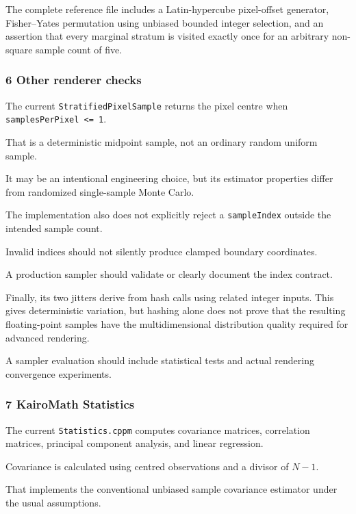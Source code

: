 The complete reference file includes a Latin-hypercube pixel-offset generator, Fisher--Yates permutation using unbiased bounded integer selection, and an assertion that every marginal stratum is visited exactly once for an arbitrary non-square sample count of five.

\subsubsection{6 Other renderer checks}\label{02-foundations-ii-ch039-other-renderer-checks}

The current \texttt{StratifiedPixelSample} returns the pixel centre when \texttt{samplesPerPixel\ \textless{}=\ 1}.

That is a deterministic midpoint sample, not an ordinary random uniform sample.

It may be an intentional engineering choice, but its estimator properties differ from randomized single-sample Monte Carlo.

The implementation also does not explicitly reject a \texttt{sampleIndex} outside the intended sample count.

Invalid indices should not silently produce clamped boundary coordinates.

A production sampler should validate or clearly document the index contract.

Finally, its two jitters derive from hash calls using related integer inputs. This gives deterministic variation, but hashing alone does not prove that the resulting floating-point samples have the multidimensional distribution quality required for advanced rendering.

A sampler evaluation should include statistical tests and actual rendering convergence experiments.

\subsubsection{7 KairoMath Statistics}\label{02-foundations-ii-ch039-kairomath-statistics}

The current \texttt{Statistics.cppm} computes covariance matrices, correlation matrices, principal component analysis, and linear regression.

Covariance is calculated using centred observations and a divisor of \(N-1\).

That implements the conventional unbiased sample covariance estimator under the usual assumptions.

